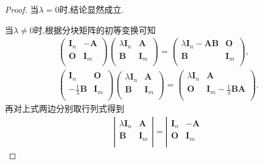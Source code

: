 \documentclass[lang=cn,newtx,10pt,scheme=chinese]{elegantbook}
\begin{document}
\begin{proof}
当$\lambda=0$时,结论显然成立.

当$\lambda\ne 0$时,根据分块矩阵的初等变换可知
\begin{gather*}
\left( \begin{matrix}
\boldsymbol{I}_n&		-\boldsymbol{A}\\
\boldsymbol{O}&		\boldsymbol{I}_m\\
\end{matrix} \right) \left( \begin{matrix}
\lambda \boldsymbol{I}_n&		\boldsymbol{A}\\
\boldsymbol{B}&		\boldsymbol{I}_m\\
\end{matrix} \right) =\left( \begin{matrix}
\lambda \boldsymbol{I}_n-\boldsymbol{AB}&		\boldsymbol{O}\\
\boldsymbol{B}&		\boldsymbol{I}_m\\
\end{matrix} \right) ,
\\
\left( \begin{matrix}
\boldsymbol{I}_n&		\boldsymbol{O}\\
-\frac{1}{\lambda}\boldsymbol{B}&		\boldsymbol{I}_m\\
\end{matrix} \right) \left( \begin{matrix}
\lambda \boldsymbol{I}_n&		\boldsymbol{A}\\
\boldsymbol{B}&		\boldsymbol{I}_m\\
\end{matrix} \right) =\left( \begin{matrix}
\lambda \boldsymbol{I}_n&		\boldsymbol{A}\\
\boldsymbol{O}&		\boldsymbol{I}_m-\frac{1}{\lambda}\boldsymbol{BA}\\
\end{matrix} \right) .
\end{gather*}
再对上式两边分别取行列式得到
\begin{gather*}
\left| \begin{matrix}
\lambda \boldsymbol{I}_n&		\boldsymbol{A}\\
\boldsymbol{B}&		\boldsymbol{I}_m\\
\end{matrix} \right|=\left| \begin{matrix}
\boldsymbol{I}_n&		-\boldsymbol{A}\\
\boldsymbol{O}&		\boldsymbol{I}_m\\

\end{matrix}
\end{gather*}
\end{proof}
\end{document}
